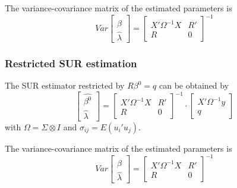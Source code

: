 \documentclass[article]{jss}
\begin{document}
The variance-covariance matrix of the estimated parameters is
\begin{equation}
   Var 
   \left[ \begin{array}{c}
      \widehat{\beta} \\ \widehat{\lambda}
   \end{array} \right] 
   = 
   \left[ \begin{array}{cc}
      X' \Omega^{-1} X & R' \\ 
      R & 0
   \end{array} \right]^{-1}
\end{equation}

\subsubsection{Restricted SUR estimation}

The SUR estimator restricted by $R \beta^0 = q$ can be obtained by
\begin{equation}
   \left[ \begin{array}{c}
      \widehat{\beta^0} \\ \widehat{\lambda}
   \end{array} \right]
   =
   \left[ \begin{array}{cc}
      X' \Omega^{-1} X & R' \\ 
      R & 0
   \end{array} \right]^{-1}
   \cdot
   \left[ \begin{array}{c}
      X' \Omega^{-1} y \\ q 
   \end{array} \right]
\end{equation}
with $\Omega = \Sigma \otimes I$ and
$\sigma_{ij} = E \left( u_i' u_j \right)$.

The variance-covariance matrix of the estimated parameters is
\begin{equation}
   Var 
   \left[ \begin{array}{c}
      \widehat{\beta} \\ \widehat{\lambda}
   \end{array} \right] 
   = 
   \left[ \begin{array}{cc}
      X' \Omega^{-1} X & R' \\ 
      R & 0
   \end{array} \right]^{-1}
\end{equation}

\end{document}
